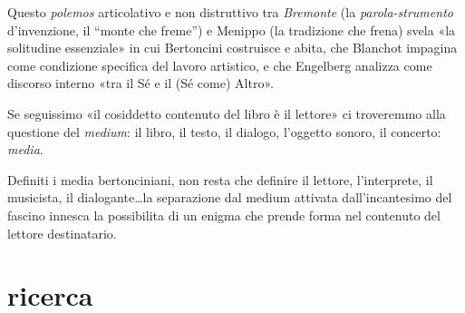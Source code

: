 Questo \emph{polemos} articolativo e non distruttivo tra \emph{Bremonte} (la
\emph{parola-strumento} d'invenzione, il “monte che freme”) e Menippo (la
tradizione che frena) svela «la solitudine essenziale» in cui Bertoncini
costruisce e abita, che Blanchot \cite{blanchot82} impagina come condizione specifica
del lavoro artistico, e che Engelberg \cite{engelberg01}
analizza come discorso interno «tra il Sé e il (Sé come) Altro».

Se seguissimo «il cosiddetto contenuto del libro è il lettore» ci troveremmo alla
questione del \emph{medium}: il libro, il testo, il dialogo, l'oggetto sonoro,
il concerto: \emph{media}.

Definiti i media bertonciniani, non resta che definire il lettore, l'interprete,
il musicista, il dialogante\ldots la separazione dal medium attivata
dall'incantesimo del fascino innesca la possibilita di un enigma che prende
forma nel contenuto del lettore destinatario.

\section*{ricerca}

